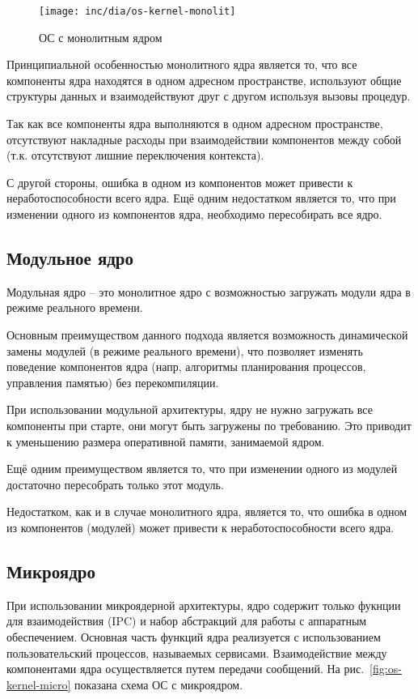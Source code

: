 \begin{figure}[ht!]
  \centering
  \texttt{[image: inc/dia/os-kernel-monolit]}
  \caption{ОС с монолитным ядром}
  \label{fig:os-kernel-monolit}
\end{figure}

Принципиальной особенностью монолитного ядра является то, что все компоненты
ядра находятся в одном адресном пространстве, используют общие структуры
данных и взаимодействуют друг с другом используя вызовы процедур.

Так как все компоненты ядра выполняются в одном адресном пространстве,
отсутствуют накладные расходы при взаимодействии компонентов между собой (т.к.
отсутствуют лишние переключения контекста).

С другой стороны, ошибка в одном из компонентов может привести к
неработоспособности всего ядра. Ещё одним недостатком является то,
что при изменении одного из компонентов ядра, необходимо
пересобирать все ядро.

\subsection{Модульное ядро}
Модульная ядро -- это монолитное ядро с возможностью загружать модули
ядра в режиме реального времени.

Основным преимуществом данного подхода является возможность динамической
замены модулей (в режиме реального времени), что позволяет изменять
поведение компонентов ядра (напр, алгоритмы планирования процессов,
управления памятью) без перекомпиляции.

При использовании модульной архитектуры, ядру не нужно
загружать все компоненты при старте, они могут быть загружены по требованию.
Это приводит к уменьшению размера оперативной памяти, занимаемой ядром.

Ещё одним преимуществом является то, что при изменении одного из модулей
достаточно пересобрать только этот модуль.

Недостатком, как и в случае монолитного ядра, является то, что ошибка
в одном из компонентов (модулей) может привести к неработоспособности
всего ядра.

\subsection{Микроядро}
При использовании микроядерной архитектуры, ядро содержит только фукнции для
взаимодействия (IPC) и набор абстракций для работы с аппаратным обеспечением.
Основная часть функций ядра реализуется с использованием пользовательский
процессов, называемых сервисами. Взаимодействие между компонентами ядра
осуществляется путем передачи сообщений. На рис.~\ref{fig:os-kernel-micro} показана
схема ОС с микроядром.

